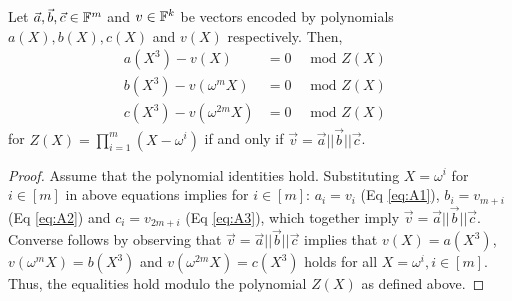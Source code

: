 \begin{lemma}\label{lem:vec-concatenation}
Let $\vec{a},\vec{b},\vec{c}\in \mathbb{F}^m$  and $v\in \mathbb{F}^k$ be vectors encoded by polynomials
$a(X),b(X),c(X)$ and $v(X)$ respectively. Then,
\begin{align}
    a(X^3) - v(X)  &= 0  \quad \text{ mod $Z(X)$ } \tag{A1}\label{eq:A1}\\
    b(X^3) - v(\omega^m X)  &= 0   \quad \text{ mod $Z(X)$ } \tag{A2}\label{eq:A2}\\
    c(X^3) - v(\omega^{2m} X) &= 0 \quad \text{ mod $Z(X)$ } \tag{A3}\label{eq:A3}
\end{align}
for $Z(X)=\prod_{i=1}^m (X-\omega^i)$ if and only if $\vec{v}=\vec{a}||\vec{b}||\vec{c}$.
\end{lemma}
\begin{proof}
    Assume that the polynomial identities hold. Substituting $X=\omega^i$ for $i\in [m]$ in above equations implies
    for $i\in [m]$: $a_i=v_i$ (Eq \eqref{eq:A1}), $b_i=v_{m+i}$ (Eq \eqref{eq:A2}) and $c_i=v_{2m+i}$ (Eq \eqref{eq:A3}),
    which together imply $\vec{v}=\vec{a}||\vec{b}||\vec{c}$. Converse follows by observing that $\vec{v}=\vec{a}||\vec{b}||\vec{c}$
    implies that $v(X) = a(X^3)$, $v(\omega^m X)=b(X^3)$ and $v(\omega^{2m} X)=c(X^3)$ holds for all $X=\omega^i, i\in [m]$.
    Thus, the equalities hold modulo the polynomial $Z(X)$ as defined above.
\end{proof}

